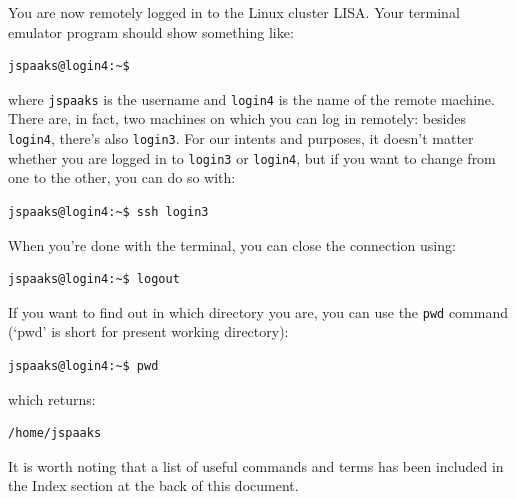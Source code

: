 You are now remotely logged in to the Linux cluster LISA. Your terminal emulator program should show something like:
\begin{lstlisting}[style=basic,style=bash]
jspaaks@login4:~$
\end{lstlisting}
where \texttt{jspaaks} is the username and \texttt{login4} is the name of the remote machine. There are, in fact, two machines on which you can log in remotely: besides \lstinline[style=bashinline]{login4}, there's also \lstinline[style=bashinline]{login3}. For our intents and purposes, it doesn't matter whether you are logged in to \lstinline[style=bashinline]{login3} or \lstinline[style=bashinline]{login4}, but if you want to change from one to the other, you can do so with:
\begin{lstlisting}[style=basic,style=bash]
jspaaks@login4:~$ ssh login3
\end{lstlisting}

When you're done with the terminal, you can close the connection using: 
\begin{lstlisting}[style=basic,style=bash]
jspaaks@login4:~$ logout
\end{lstlisting}


If you want to find out in which directory you are, you can use the \lstinline[style=bashinline]{pwd} command (`pwd' is short for present working directory):
\begin{lstlisting}[style=basic,style=bash]
jspaaks@login4:~$ pwd
\end{lstlisting}
which returns:
\begin{lstlisting}[style=basic,style=bash]
/home/jspaaks
\end{lstlisting}
It is worth noting that a list of useful commands and terms has been included in the Index section at the back of this document.

